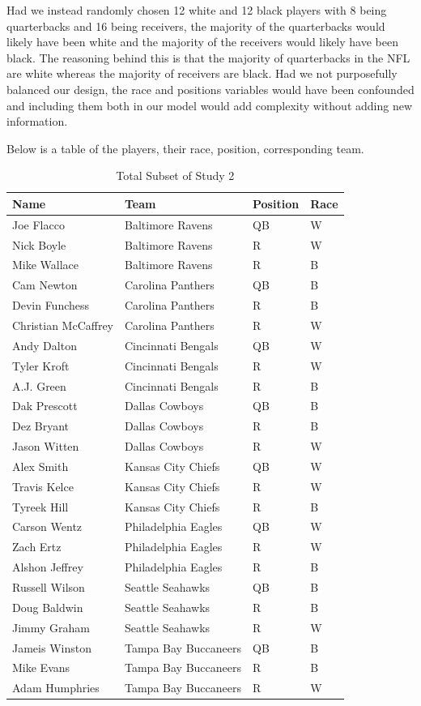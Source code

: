 \documentclass[12pt,twoside]{reedthesis}
\begin{document}
Had we instead randomly chosen 12 white and 12 black players with 8
being quarterbacks and 16 being receivers, the majority of the
quarterbacks would likely have been white and the majority of the
receivers would likely have been black. The reasoning behind this is
that the majority of quarterbacks in the NFL are white whereas the
majority of receivers are black. Had we not purposefully balanced our
design, the race and positions variables would have been confounded and
including them both in our model would add complexity without adding new
information.

Below is a table of the players, their race, position, corresponding
team.
\begin{table}[!h]

\caption[Total Subset of Study 2]{\label{tab:subset}Total Subset of Study 2}
\centering
\begin{tabular}{l|l|l|l}
\hline
Name & Team & Position & Race\\
\hline
Joe Flacco & Baltimore Ravens & QB & W\\
\hline
Nick Boyle & Baltimore Ravens & R & W\\
\hline
Mike Wallace & Baltimore Ravens & R & B\\
\hline
Cam Newton & Carolina Panthers & QB & B\\
\hline
Devin Funchess & Carolina Panthers & R & B\\
\hline
Christian McCaffrey & Carolina Panthers & R & W\\
\hline
Andy Dalton & Cincinnati Bengals & QB & W\\
\hline
Tyler Kroft & Cincinnati Bengals & R & W\\
\hline
A.J. Green & Cincinnati Bengals & R & B\\
\hline
Dak Prescott & Dallas Cowboys & QB & B\\
\hline
Dez Bryant & Dallas Cowboys & R & B\\
\hline
Jason Witten & Dallas Cowboys & R & W\\
\hline
Alex Smith & Kansas City Chiefs & QB & W\\
\hline
Travis Kelce & Kansas City Chiefs & R & W\\
\hline
Tyreek Hill & Kansas City Chiefs & R & B\\
\hline
Carson Wentz & Philadelphia Eagles & QB & W\\
\hline
Zach Ertz & Philadelphia Eagles & R & W\\
\hline
Alshon Jeffrey & Philadelphia Eagles & R & B\\
\hline
Russell Wilson & Seattle Seahawks & QB & B\\
\hline
Doug Baldwin & Seattle Seahawks & R & B\\
\hline
Jimmy Graham & Seattle Seahawks & R & W\\
\hline
Jameis Winston & Tampa Bay Buccaneers & QB & B\\
\hline
Mike Evans & Tampa Bay Buccaneers & R & B\\
\hline
Adam Humphries & Tampa Bay Buccaneers & R & W\\
\hline
\end{tabular}
\end{table}
\end{document}
